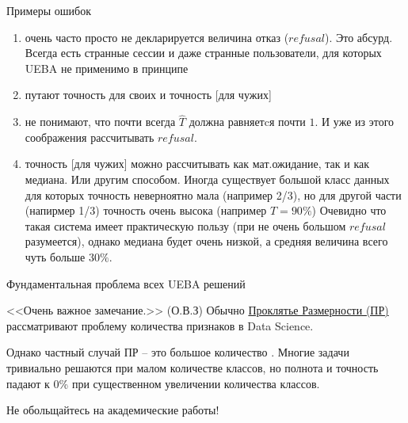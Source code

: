 \begin{frame}{Примеры ошибок}
	\small
	\begin{enumerate}
		\item очень часто просто не декларируется величина отказ ($refusal$).
		Это абсурд. Всегда есть странные сессии и даже странные пользователи,
		для которых  UEBA не применимо в принципе
		\item путают точность для своих и точность [для чужих]
		\item не понимают, что почти всегда $\hat T$ должна равняетcя почти $1$.
		И уже из этого соображения рассчитывать $refusal$.
		\item точность [для чужих] можно рассчитывать как мат.ожидание, так и как медиана.
		Или другим способом.
		Иногда существует большой класс данных для которых точность неверноятно мала 
		(например 2/3), но для другой части (напирмер 1/3) точность очень высока (например $T=90\%$)
		Очевидно что такая система имеет практическую пользу 
		(при не очень большом $refusal$ разумеется), однако медиана будет очень низкой,
		а средняя величина всего чуть больше $30\%$.
	\end{enumerate}
\end{frame}

\begin{frame}{Фундаментальная проблема всех UEBA решений}
\begin{block}{<<Очень важное замечание.>> (О.В.З)}
	Обычно \href{https\%3A\%2F\%2Fru.wikipedia.org\%2Fwiki\%2F\%D0\%9F\%D1\%80\%D0\%BE\%D0\%BA\%D0\%BB\%D1\%8F\%D1\%82\%D0\%B8\%D0\%B5_\%D1\%80\%D0\%B0\%D0\%B7\%D0\%BC\%D0\%B5\%D1\%80\%D0\%BD\%D0\%BE\%D1\%81\%D1\%82\%D0\%B8}{Проклятье Размерности (ПР)}
	рассматривают проблему количества признаков в Data Science.
	
	Однако частный случай ПР -- это большое количество .
	Многие задачи тривиально решаются при малом количестве классов, 
	но полнота и точность падают к 0\% при существенном увеличении количества классов.
	
	Не обольщайтесь на академические работы!
\end{block}
\end{frame}

